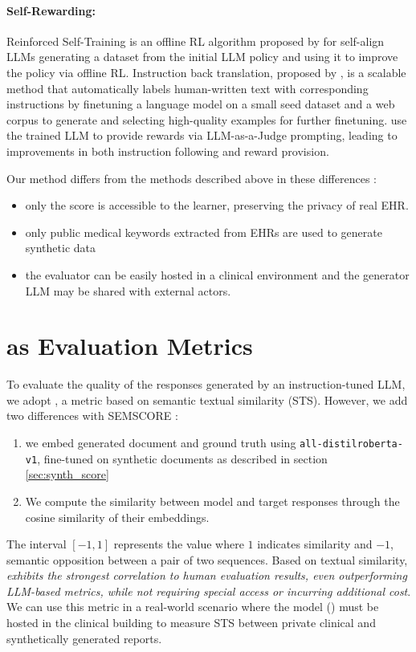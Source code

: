 \paragraph{Self-Rewarding:}
Reinforced Self-Training is an offline RL algorithm proposed by \cite{gulcehre_reinforced_2023} for self-align LLMs generating a dataset from the initial LLM policy and using it to improve the policy via offline RL. Instruction back translation, proposed by \cite{li_self-alignment_2023}, is a scalable method that automatically labels human-written text with corresponding instructions by finetuning a language model on a small seed dataset and a web corpus to generate and selecting high-quality examples for further finetuning. \cite{yuan_self-rewarding_2024-1} use the trained LLM to provide rewards via LLM-as-a-Judge prompting, leading to improvements in both instruction following and reward provision.

Our method differs from the methods described above in these differences : 
\begin{itemize}
    \item only the score is accessible to the learner, preserving the privacy of real EHR.
    \item only public medical keywords extracted from EHRs are used to generate synthetic data
    \item the \score evaluator can be easily hosted in a clinical environment and the generator LLM may be shared with external actors.
\end{itemize}

\section{\score as Evaluation Metrics}

To evaluate the quality of the responses generated by an instruction-tuned LLM, we adopt \score, a metric based on semantic textual similarity (STS). However, we add two differences with SEMSCORE \citep{aynetdinov2024semscore}:
\begin{enumerate}
\item we embed generated document and ground truth using \space\verb|all-distilroberta-v1|, fine-tuned on synthetic documents as described in section \ref{sec:synth_score}
\item We compute the similarity between model and target responses through the cosine similarity of their embeddings.
\end{enumerate}
The interval $[-1, 1]$ represents the value where $1$ indicates similarity and $-1$, semantic opposition between a pair of two sequences. Based on textual similarity, \textit{\score exhibits the strongest correlation to human evaluation results, even outperforming LLM-based metrics, while not requiring special access or incurring additional cost}. We can use this metric in a real-world scenario where the model (\me) must be hosted in the clinical building to measure STS between private clinical and synthetically generated reports.    

